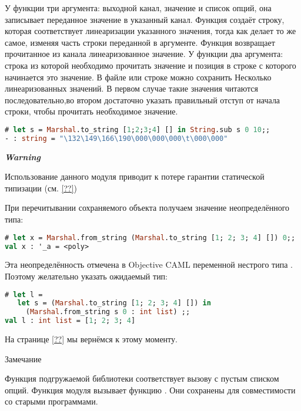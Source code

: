 У функции  три аргумента: выходной канал, значение и список 
опций, она записывает переданное значение в указанный канал. Функция 
 создаёт строку, которая соответствует линеаризации указанного 
значения, тогда как  делает то же самое, изменяя часть строки 
переданной в аргументе. Функция  возвращает прочитанное из 
канала линеаризованное значение. У функции  два аргумента: 
строка из которой необходимо прочитать значение и позиция в строке с которого 
начинается это значение. В файле или строке можно сохранить Несколько 
линеаризованных значений. В первом случае такие значения читаются 
последовательно,во втором достаточно указать правильный отступ от начала строки, 
чтобы прочитать необходимое значение.

\begin{lstlisting}[language=OCaml]
# let s = Marshal.to_string [1;2;3;4] [] in String.sub s 0 10;;
- : string = "\132\149\166\190\000\000\000\t\000\000"
\end{lstlisting}

{\it \bf Warning}

Использование данного модуля приводит к потере гарантии статической типизации 
(см. \ref{??})

При перечитывании сохраняемого объекта получаем значение неопределённого типа:

\begin{lstlisting}[language=OCaml]
# let x = Marshal.from_string (Marshal.to_string [1; 2; 3; 4] []) 0;;
val x : '_a = <poly>
\end{lstlisting}

Эта неопределённость отмечена в Objective CAML переменной нестрого типа 
. Поэтому желательно указать ожидаемый тип:

\begin{lstlisting}[language=OCaml]
# let l = 
   let s = (Marshal.to_string [1; 2; 3; 4] []) in 
     (Marshal.from_string s 0 : int list) ;;
val l : int list = [1; 2; 3; 4]
\end{lstlisting}

На странице \ref{??} мы вернёмся к этому моменту. 

Замечание

Функция  подгружаемой библиотеки соответствует вызову 
 с пустым списком опций. Функция  модуля 
 вызывает функцию . Они сохранены для 
совместимости со старыми программами.


